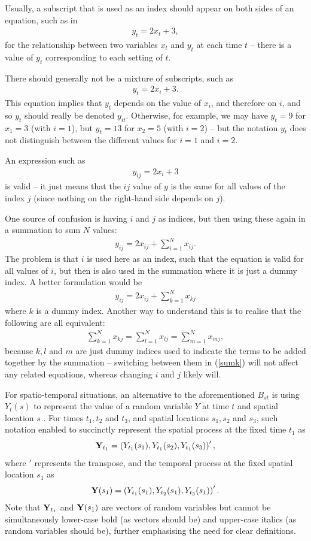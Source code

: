 \documentclass[12pt]{article}
\newcommand{\eb}{\begin{eqnarray}}
\newcommand{\ee}{\end{eqnarray}}
\begin{document}
Usually, a subscript that is used as an index should appear on both sides of
an equation, such as in
\eb
y_t = 2 x_t + 3,
\label{ytxt}
\ee
for the relationship between two variables $x_t$ and $y_t$ at each time $t$ --
there is a value of $y_t$ corresponding to each setting of $t$.

There should generally not be a mixture of subscripts, such as
\eb
y_t = 2 x_i + 3.
\ee
This equation implies that $y_t$ depends on the value of $x_i$, and therefore
on $i$, and so $y_t$ should really be denoted $y_{it}$. Otherwise, for example,
we may have $y_t = 9$
for $x_1 = 3$ (with $i=1$), but $y_t = 13$ for $x_2 = 5$ (with $i=2$) -- but the
notation $y_t$ does not distinguish between the different values for $i=1$ and 
$i=2$.

An expression such as
\eb
y_{ij} = 2 x_i + 3
\ee
is valid -- it just means that the $ij$ value of $y$ is the same
for all values of the index $j$ (since nothing on the right-hand side depends
on $j$).

One source of confusion is having $i$ and $j$ as indices, but then using these
again in a summation to sum $N$ values:
\eb
y_{ij} = 2 x_{ij} + \sum_{i=1}^N x_{ij}.
\ee
The problem is that $i$ is used here as an index, such that the equation is
valid for all values of $i$, but then is also used in the summation where it
is just a dummy index. A better formulation would be
\eb
y_{ij} = 2 x_{ij} + \sum_{k=1}^N x_{kj}
\label{sumk}
\ee
where $k$ is a dummy index.
Another way to understand this is to realise that
the following are all equivalent:
\eb
\sum_{k=1}^N x_{kj} = \sum_{l=1}^N x_{lj} = \sum_{m=1}^N x_{mj},
\ee
because $k, l$ and $m$ are just dummy indices used to indicate the terms to 
be added together by the summation -- switching between them in (\ref{sumk})
will not affect any related equations, whereas changing $i$ and $j$ likely will.

For spatio-temporal situations, an alternative to the aforementioned $B_{st}$ 
is using
$Y_t(s)$ to represent the value of a random variable $Y$ at time $t$ and spatial
location $s$ \citep{cw11}. For times $t_1, t_2$ and $t_3$, and spatial locations 
$s_1, s_2$ and $s_3$, such notation enabled \cite{cw11} to succinctly represent the
spatial process at the fixed time $t_1$ as
\eb
{\bf Y}_{t_1} = \left(Y_{t_1}(s_1), Y_{t_1}(s_2), Y_{t_1}(s_3) \right)',
\label{Yt1}
\ee
where $'$ represents the transpose,
and the temporal process at the fixed spatial location $s_1$ as
\eb
{\bf Y}(s_1) = \left(Y_{t_1}(s_1), Y_{t_2}(s_1), Y_{t_3}(s_1) \right)'.
\ee
Note that ${\bf Y}_{t_1}$ and ${\bf Y}(s_1)$ are
vectors of random variables but cannot be simultaneously lower-case bold
(as vectors should be) and upper-case italics (as random variables should be),
further emphasising the need for clear definitions.
\end{document}
